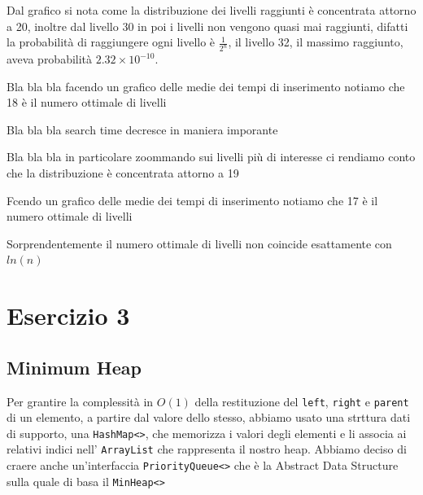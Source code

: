 \documentclass[letterpaper]{report}
\begin{document}
Dal grafico si nota come la distribuzione dei livelli raggiunti è concentrata 
attorno a 20, inoltre dal livello 30 in poi i livelli non vengono quasi mai raggiunti, 
difatti la probabilità di raggiungere ogni livello è $\frac{1}{2^n}$, il livello
32, il massimo raggiunto, aveva probabilità $2.32 \times 10^{-10}$.
\begin{figure}[H]
\centering
    
\end{figure}

Bla bla bla facendo un grafico delle medie dei tempi di inserimento notiamo che 18
è il numero ottimale di livelli
\begin{figure}[H]
\centering
    
\end{figure}

Bla bla bla search time decresce in maniera imporante
\begin{figure}[H]
\centering
    
\end{figure}

Bla bla bla in particolare zoommando sui livelli più di interesse ci rendiamo conto
che la distribuzione è concentrata attorno a 19
\begin{figure}[H]
\centering
    
\end{figure}

Fcendo un grafico delle medie dei tempi di inserimento notiamo che 17
è il numero ottimale di livelli
\begin{figure}[H]
\centering
    
\end{figure}
Sorprendentemente il numero ottimale di livelli non coincide esattamente con $ln(n)$

\chapter*{Esercizio 3}
\section{Minimum Heap}
Per grantire la complessità in $O(1)$ della restituzione del \verb|left|, \verb|right|
e \verb|parent| di un elemento, a partire dal valore dello stesso, abbiamo usato 
una strttura dati di supporto, una \verb|HashMap<>|, che memorizza i valori degli 
elementi e li associa ai relativi indici nell' \verb|ArrayList| che rappresenta il 
nostro heap.
\newline
\newline
Abbiamo deciso di craere anche un'interfaccia \verb|PriorityQueue<>| che è la Abstract
Data Structure sulla quale di basa il \verb|MinHeap<>|
\end{document}
